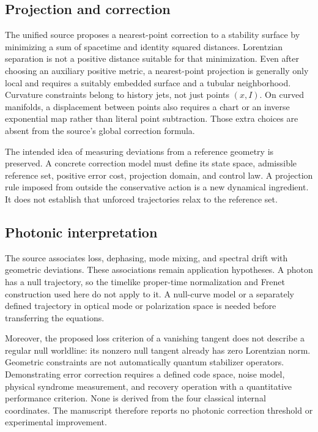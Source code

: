 \documentclass[aip,jmp,reprint,onecolumn,amsmath,amssymb]{revtex4-2}
\begin{document}
\subsection{Projection and correction}
The unified source proposes a nearest-point correction to a stability surface by minimizing a sum of spacetime and identity squared distances.\cite{unified} Lorentzian separation is not a positive distance suitable for that minimization. Even after choosing an auxiliary positive metric, a nearest-point projection is generally only local and requires a suitably embedded surface and a tubular neighborhood. Curvature constraints belong to history jets, not just points $(x,I)$. On curved manifolds, a displacement between points also requires a chart or an inverse exponential map rather than literal point subtraction. Those extra choices are absent from the source's global correction formula.

The intended idea of measuring deviations from a reference geometry is preserved. A concrete correction model must define its state space, admissible reference set, positive error cost, projection domain, and control law. A projection rule imposed from outside the conservative action is a new dynamical ingredient. It does not establish that unforced trajectories relax to the reference set.

\subsection{Photonic interpretation}
The source associates loss, dephasing, mode mixing, and spectral drift with geometric deviations. These associations remain application hypotheses. A photon has a null trajectory, so the timelike proper-time normalization and Frenet construction used here do not apply to it. A null-curve model or a separately defined trajectory in optical mode or polarization space is needed before transferring the equations.

Moreover, the proposed loss criterion of a vanishing tangent does not describe a regular null worldline: its nonzero null tangent already has zero Lorentzian norm. Geometric constraints are not automatically quantum stabilizer operators. Demonstrating error correction requires a defined code space, noise model, physical syndrome measurement, and recovery operation with a quantitative performance criterion. None is derived from the four classical internal coordinates. The manuscript therefore reports no photonic correction threshold or experimental improvement.
\end{document}
